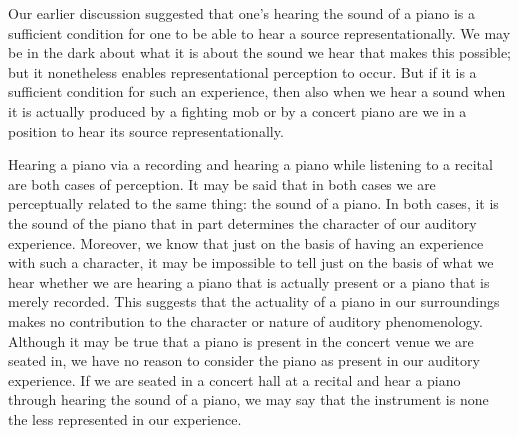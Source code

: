 \documentclass[sloppy, journal, git, bytitle, dodraft]{humapap}
\begin{document}
Our earlier discussion suggested that one's hearing the sound of a piano is a sufficient condition for one to be able to hear a source representationally. We may be in the dark about what it is about the sound we hear that makes this possible; but it nonetheless enables representational perception to occur. But if it is a sufficient condition for such an experience, then also when we hear a sound when it is actually produced by a fighting mob or by a concert piano are we in a position to hear its source representationally. 

Hearing a piano via a recording and hearing a piano while listening to a recital are both cases of perception. It may be said that in both cases we are perceptually related to the same thing: the sound of a piano. In both cases, it is the sound of the piano that in part determines the character of our auditory experience. Moreover, we know that just on the basis of having an experience with such a character, it may be impossible to tell just on the basis of what we hear whether we are hearing a piano that is actually present or a piano that is merely recorded. This suggests that the actuality of a piano in our surroundings makes no contribution to the character or nature of auditory phenomenology. Although it may be true that a piano is present in the concert venue we are seated in, we have no reason to consider the piano as present in our auditory experience.  If we are seated in a concert hall at a recital and hear a piano through hearing the sound of a piano, we may say that the instrument is none the less represented in our experience.  


\end{document}
